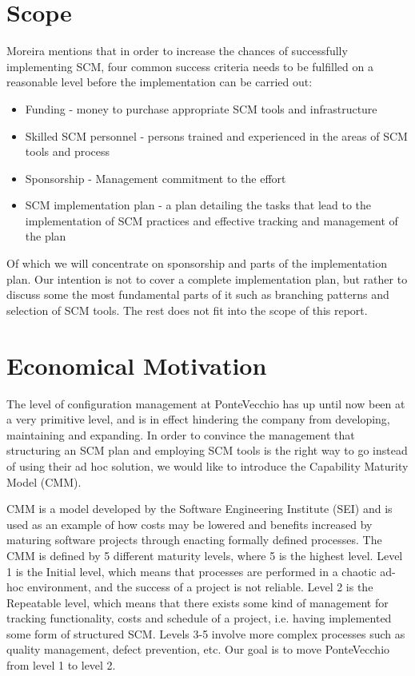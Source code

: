 \documentclass[10pt]{article}
\begin{document}
\section{Scope}
Moreira\cite{Moreira} mentions that in order to increase the chances of successfully implementing SCM, four common success criteria needs to be fulfilled on a reasonable level before the implementation can
be carried out:
\begin{itemize}
\item Funding - money to purchase appropriate SCM tools and infrastructure
\item Skilled SCM personnel - persons trained and experienced in the areas of SCM tools and process
\item Sponsorship - Management commitment to the effort
\item SCM implementation plan - a plan detailing the tasks that lead to the implementation of SCM practices and effective tracking and management of the plan
\end{itemize}
Of which we will concentrate on sponsorship and parts of the implementation plan. Our intention is not to cover a complete implementation plan, but rather to discuss some the most fundamental parts of it such as branching patterns and selection of SCM tools. The rest does not fit into the scope of this report.
 
\section{Economical Motivation}
The level of configuration management at PonteVecchio has up until now been at a very primitive level, and is in effect hindering the company from developing, maintaining and expanding. In order to convince the management that structuring an SCM plan and employing SCM tools is the right way to go instead of using their ad hoc solution, we would like to introduce the Capability Maturity Model (CMM). 

\noindent CMM is a model developed by the Software Engineering Institute (SEI) and is used as an example of how costs may be lowered and benefits increased by maturing software projects through enacting formally defined processes. The CMM is defined by 5 different maturity levels, where 5 is the highest level. Level 1 is the Initial level, which means that processes are performed in a chaotic ad-hoc environment, and the success of a project is not reliable. Level 2 is the Repeatable level, which means that there exists some kind of management for tracking functionality, costs and schedule of a project\cite{Merant}, i.e. having implemented some form of structured SCM. Levels 3-5 involve more complex processes such as quality management, defect prevention, etc. Our goal is to move PonteVecchio from level 1 to level 2. 
\end{document}
